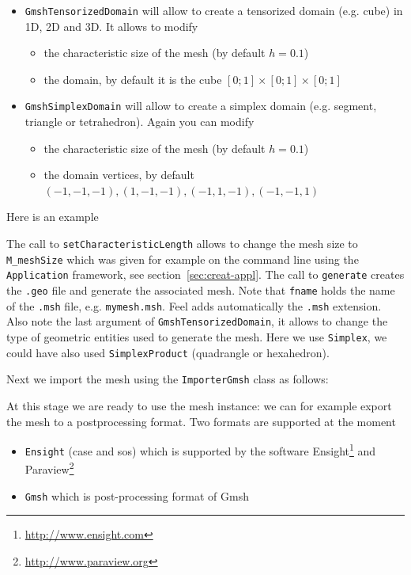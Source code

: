 \documentclass[a4paper]{book}
\newcommand{\feel}{Feel\xspace}
\begin{document}
\begin{itemize}
\item \lstinline!GmshTensorizedDomain! will allow to create a
  tensorized domain (e.g. cube) in 1D, 2D and 3D. It allows to modify
  \begin{itemize}
  \item the characteristic size of the mesh (by default $h=0.1$)
  \item the domain, by default it is the cube $[0;1]\times[0;1]\times[0;1]$
  \end{itemize}
\item \lstinline!GmshSimplexDomain! will allow to create a simplex
  domain (e.g. segment, triangle or tetrahedron). Again you can modify
  \begin{itemize}
  \item the characteristic size of the mesh (by default $h=0.1$)
  \item the domain vertices, by default $(-1,-1,-1), (1,-1,-1), (-1,1,-1), (-1,-1,1)$
  \end{itemize}
\end{itemize}

Here is an example



The call to \lstinline!setCharacteristicLength! allows to change the
mesh size to \lstinline!M_meshSize! which was given for example on the
command line using the \lstinline!Application! framework, see
section~\ref{sec:creat-appl}. The call to \lstinline!generate! creates
the \lstinline!.geo! file and generate the associated mesh. Note that
\lstinline!fname! holds the name of the \lstinline!.msh! file,
e.g. \lstinline!mymesh.msh!. \feel adds automatically the
\lstinline!.msh!  extension. Also note the last argument of
\lstinline!GmshTensorizedDomain!, it allows to change the type of
geometric entities used to generate the mesh. Here we use
\lstinline!Simplex!, we could have also used
\lstinline!SimplexProduct! (quadrangle or hexahedron).


Next we import the mesh using the
\lstinline!ImporterGmsh! class as follows:




At this stage we are ready to use the mesh instance: we can for
example export the mesh to a postprocessing format. Two formats are
supported at the moment
\begin{itemize}
\item \lstinline!Ensight! (case and sos) which is supported by the
  software Ensight\footnote{\url{http://www.ensight.com}} and
  Paraview\footnote{\url{http://www.paraview.org}}
\item \lstinline!Gmsh! which is post-processing format of Gmsh
\end{itemize}
\end{document}
